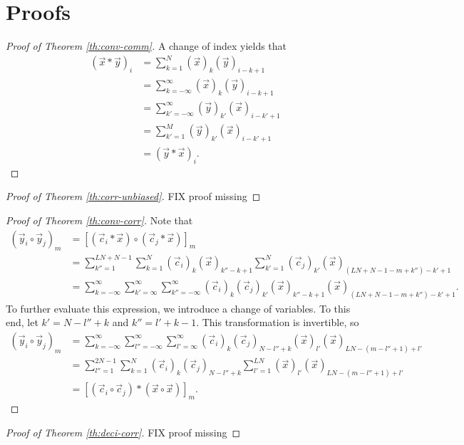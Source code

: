 \documentclass[a4paper, openany, oneside]{memoir}
\begin{document}
\chapter{Proofs}
\begin{proof}[Proof of Theorem \ref{th:conv-comm}]
    A change of index yields that
    \begin{align*}
        (\vec{x} \ast \vec{y})_i &= \sum_{k=1}^{N} (\vec{x})_k (\vec{y})_{i-k+1} \\
        &= \sum_{k=-\infty}^{\infty} (\vec{x})_k (\vec{y})_{i-k+1} \\
        &= \sum_{k'=-\infty}^{\infty} (\vec{y})_{k'} (\vec{x})_{i-k'+1} \\
        &= \sum_{k'=1}^{M} (\vec{y})_{k'} (\vec{x})_{i-k'+1} \\
        &= (\vec{y} \ast \vec{x})_i.
    \end{align*}
\end{proof}
\begin{proof}[Proof of Theorem \ref{th:corr-unbiased}]
    FIX proof missing
\end{proof}
\begin{proof}[Proof of Theorem \ref{th:conv-corr}]
    Note that
    \begin{align*}
        (\vec{y}_i \circ \vec{y}_j)_m
        &= [(\vec{c}_i \ast \vec{x}) \circ (\vec{c}_j \ast \vec{x})]_m \\
        &=\sum_{k''=1}^{LN+N-1}\sum_{k=1}^N (\vec{c}_i)_k (\vec{x})_{k''-k+1}\sum_{k'=1}^{N}(\vec{c}_j)_{k'}(\vec{x})_{(LN+N-1-m+k'')-k'+1} \\
        &=\sum_{k=-\infty}^\infty\sum_{k'=\infty}^{\infty}\sum_{k''=-\infty}^{\infty} (\vec{c}_i)_k (\vec{c}_j)_{k'}(\vec{x})_{k''-k+1}(\vec{x})_{(LN+N-1-m+k'')-k'+1}.
    \end{align*}
    To further evaluate this expression, we introduce a change of variables. To this end, let $k' = N -l'' +k$ and $k'' = l' + k - 1$. This transformation is invertible, so
    \begin{align*}
        (\vec{y}_i \circ \vec{y}_j)_m
        &=\sum_{k=-\infty}^\infty\sum_{l''=-\infty}^{\infty}\sum_{l'=\infty}^{\infty} (\vec{c}_i)_k (\vec{c}_j)_{N -l'' +k}(\vec{x})_{l'}
        (\vec{x})_{LN-(m-l'' + 1)+l'} \\
        &=\sum_{l''=1}^{2N-1}\sum_{k=1}^{N}(\vec{c}_i)_k (\vec{c}_j)_{N -l'' +k}\sum_{l'=1}^{LN}(\vec{x})_{l'}
        (\vec{x})_{LN-(m-l'' + 1)+l'} \\
        &=[(\vec{c}_i \circ \vec{c}_j) \ast (\vec{x} \circ \vec{x})]_m.
    \end{align*}
\end{proof}
\begin{proof}[Proof of Theorem \ref{th:deci-corr}]
    FIX proof missing
\end{proof}
\end{document}
